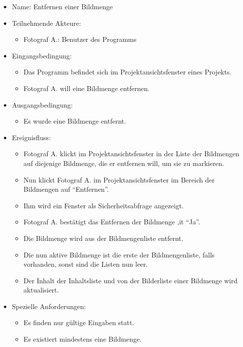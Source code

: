 	\begin{itemize}
		\item Name: Entfernen einer Bildmenge
		\item Teilnehmende Akteure:
		\begin{itemize}
			\item	Fotograf A.: Benutzer des Programms		
		\end{itemize}
		\item Eingangsbedingung:
		\begin{itemize}
			\item	Das Programm befindet sich im Projektansichtsfenster eines Projekts.
			\item Fotograf A. will eine Bildmenge entfernen.
		\end{itemize}
		\item Ausgangsbedingung:
		\begin{itemize}
			\item	Es wurde eine Bildmenge entfernt.	
		\end{itemize}
		\item Ereignisfluss:
		\begin{itemize}
			\item Fotograf A. klickt im Projektansichtsfenster in der Liste der Bildmengen auf diejenige Bildmenge, die er entfernen will, um sie zu markieren.		
			\item Nun klickt Fotograf A. im Projektansichtsfenster im Bereich der Bildmengen auf "`Entfernen"'.
			\item Ihm wird ein Fenster als Sicherheitsabfrage angezeigt.
			\item Fotograf A. bestätigt das Entfernen der Bildmenge ,it "`Ja"'.
			\item Die Bildmenge wird aus der Bildmengenliste entfernt.
			\item Die nun aktive Bildmenge ist die erste der Bildmengenliste, falls vorhanden, sonst sind die Listen nun leer.
			\item Der Inhalt der Inhaltsliste und von der Bilderliste einer Bildmenge wird aktualisiert. 
		\end{itemize}
		\item Spezielle Anforderungen:
		\begin{itemize}
			\item	Es finden nur gültige Eingaben statt.
			\item Es existiert mindestens eine Bildmenge.
		\end{itemize}			
	\end{itemize}
	
